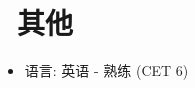 \documentclass{resume}
\begin{document}

\section{\faInfo\ 其他}
\begin{itemize}[parsep=0.5ex]
  \item 语言: 英语 - 熟练 (CET 6)
\end{itemize}

%
%
\end{document}

